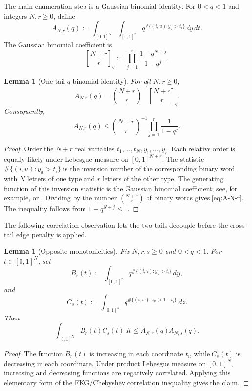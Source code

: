 \documentclass[11pt]{article}
\newtheorem{lemma}[theorem]{Lemma}
\theoremstyle{definition}
\newcommand{\qbinom}[2]{\genfrac{[}{]}{0pt}{}{#1}{#2}_q}
\begin{document}
The main enumeration step is a Gaussian-binomial identity.  For $0<q<1$ and integers $N,r\ge0$, define
\[
  A_{N,r}(q):=\int_{[0,1]^N}\int_{[0,1]^r}
  q^{\#\{(i,u):y_u>t_i\}}\,dy\,dt.
\]
The Gaussian binomial coefficient is
\[
  \qbinom{N+r}{r}:=\prod_{j=1}^r\frac{1-q^{N+j}}{1-q^j}.
\]

\begin{lemma}[One-tail $q$-binomial identity]\label{lem:qbinom-integral}
For all $N,r\ge0$,
\begin{equation}\label{eq:A-N-r}
  A_{N,r}(q)=\binom{N+r}{r}^{-1}\qbinom{N+r}{r}.
\end{equation}
Consequently,
\begin{equation}\label{eq:A-upper}
  A_{N,r}(q)
  \le \binom{N+r}{r}^{-1}\prod_{j=1}^r\frac1{1-q^j}.
\end{equation}
\end{lemma}

\begin{proof}
Order the $N+r$ real variables $t_1,\ldots,t_N,y_1,\ldots,y_r$.  Each relative order is equally likely under Lebesgue measure on $[0,1]^{N+r}$.  The statistic $\#\{(i,u):y_u>t_i\}$ is the inversion number of the corresponding binary word with $N$ letters of one type and $r$ letters of the other type.  The generating function of this inversion statistic is the Gaussian binomial coefficient; see, for example, \cite[Chapter~1]{AndrewsPartitions} or \cite[Section~1.7]{StanleyEC1}.  Dividing by the number $\binom{N+r}{r}$ of binary words gives \eqref{eq:A-N-r}.  The inequality follows from $1-q^{N+j}\le1$.
\end{proof}

\smallskip
\noindent
The following correlation observation lets the two tails decouple before the cross-tail edge penalty is applied.

\begin{lemma}[Opposite monotonicities]\label{lem:monotone}
Fix $N,r,s\ge0$ and $0<q<1$.  For $t\in[0,1]^N$, set
\[
  B_r(t):=\int_{[0,1]^r}q^{\#\{(i,u):y_u>t_i\}}\,dy,
\]
and
\[
  C_s(t):=\int_{[0,1]^s}q^{\#\{(i,w):z_w>1-t_i\}}\,dz.
\]
Then
\[
  \int_{[0,1]^N}B_r(t)C_s(t)\,dt
  \le A_{N,r}(q)A_{N,s}(q).
\]
\end{lemma}

\begin{proof}
The function $B_r(t)$ is increasing in each coordinate $t_i$, while $C_s(t)$ is decreasing in each coordinate.  Under product Lebesgue measure on $[0,1]^N$, increasing and decreasing functions are negatively correlated.  Applying this elementary form of the FKG/Chebyshev correlation inequality gives the claim.
\end{proof}
\end{document}

